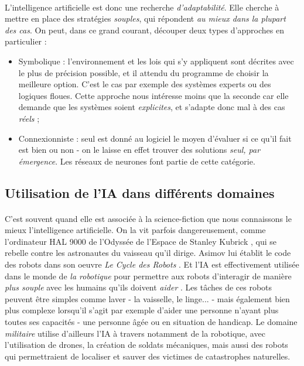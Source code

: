\paragraph{} L'intelligence artificielle est donc une recherche \emph{d'adaptabilité}. Elle cherche à mettre en place des
stratégies \emph{souples}, qui répondent \emph{au mieux dans la plupart des cas}. On peut, dans ce grand courant, découper
deux types d'approches en particulier :
\begin{itemize}
    \item Symbolique : l'environnement et les lois qui s'y appliquent sont décrites avec le plus de précision possible,
    et il attendu du programme de choisir la meilleure option. C'est le cas par exemple des systèmes experts ou des
    logiques floues. Cette approche nous intéresse moins que la seconde car elle demande que les systèmes soient \emph{
    explicites}, et s'adapte donc mal à des cas \emph{réels} ;
    \item Connexionniste : seul est donné au logiciel le moyen d'évaluer si ce qu'il fait est bien ou non - on le laisse
    en effet trouver des solutions \emph{seul, par émergence}. Les réseaux de neurones font partie de cette catégorie.
\end{itemize}

\subsection*{Utilisation de l'IA dans différents domaines}

\paragraph{} C'est souvent quand elle est associée à la science-fiction que nous connaissons le mieux l'intelligence
artificielle. On la vit parfois dangereusement, comme l'ordinateur HAL 9000 de l'Odyssée de l'Espace de Stanley Kubrick 
\cite{Kubrick0}, qui se rebelle contre les astronautes du vaisseau qu'il dirige. Asimov lui établit le code des robots dans 
son oeuvre \emph{Le Cycle des Robots} \cite{Asimov1}. Et l'IA est effectivement utilisée dans le monde de \emph{la robotique} 
pour permettre aux robots d'interagir de manière \emph{plus souple} avec les humains qu'ils doivent \emph{aider} \cite{AI1}. Les 
tâches de ces robots peuvent être simples comme laver - la vaisselle, le linge... - mais également bien plus complexe 
lorsqu'il s'agit par exemple d'aider une personne n'ayant plus toutes ses capacités - une personne âgée ou en situation 
de handicap. Le domaine \emph{militaire} utilise d'ailleurs l'IA à travers notamment de la robotique, avec l'utilisation 
de drones, la création de soldats mécaniques, mais aussi des robots qui permettraient de localiser et sauver des victimes 
de catastrophes naturelles.

